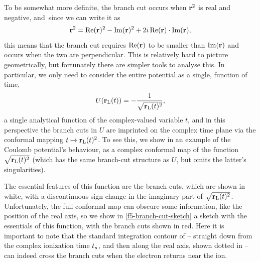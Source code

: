 To be somewhat more definite, the branch cut occurs when $\vb{r}^2$ is real and negative, and~since we can write it as
\begin{equation}
\vb{r}^2=\Re(\vb{r})^2-\Im(\vb{r})^2+2i\Re(\vb{r})\cdot\Im(\vb{r}),
\label{e5-r2-parts-breakdown}
\end{equation}
this means that the branch cut requires $\Re(\vb{r})$ to be smaller than $\Im(\vb{r})$ and occurs when the two are perpendicular. This is relatively hard to picture geometrically, but fortunately there are simpler tools to analyse this. In particular, we only need to consider the entire potential as a single, function of time,
\begin{equation}
U(\vb{r}_\mathrm{L}(t)) = -\frac{1}{\sqrt{\vb{r}_\mathrm{L}(t)^2}},
\label{e5-coulomb-potential-at-the-trajectory}
\end{equation}
a single analytical function of the complex-valued variable $t$, and in this perspective the branch cuts in $U$ are imprinted on the complex time plane via the conformal mapping $t\mapsto \vb{r}_\mathrm{L}(t)^2$. To see this, we show in  an example of the Coulomb potential's behaviour, as a complex conformal map of the function $\sqrt{\vb{r}_\mathrm{L}(t)^2}$ (which has the same branch-cut structure as $U$, but omits the latter's singularities). 




The essential features of this function are the branch cuts, which are shown in white, with a discontinuous sign change in the imaginary part of $\sqrt{\vb{r}_\mathrm{L}(t)^2}$. Unfortunately, the full conformal map can obscure some information, like the position of the real axis, so we show in \ref{f5-branch-cut-sketch} a sketch with the essentials of this function, with the branch cuts shown in red. Here it is important to note that the standard integration contour of  -- straight down from the complex ionization time ${t_s}$, and then along the real axis, shown dotted in  -- can indeed cross the branch cuts when the electron returns near the ion.



